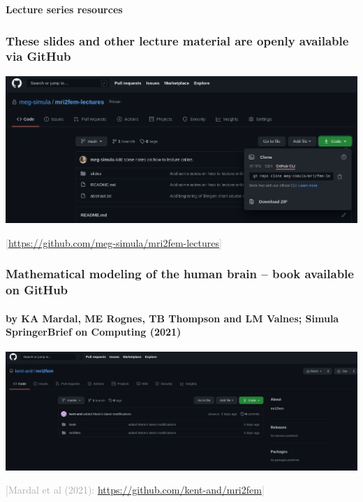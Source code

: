 \documentclass[mathserif, aspectratio=169]{beamer}
\newcommand{\refer}[1]{\begin{flushright}{\tiny \textcolor{darkgray}{[#1]}}\end{flushright}}
\newcommand{\mysection}[1]{\begin{frame} \begin{center} \vspace{3em} \textbf{#1} \end{center} \end{frame}}
\begin{document}
{
\begin{frame}
\end{frame}
}

\mysection{Lecture series resources}

\begin{frame}
  \frametitle{These slides and other lecture material are openly available via GitHub}
  \centering
  \includegraphics[width=\textwidth]{graphics/mri2fem-lectures-github.png} \\
  \refer{\href{https://github.com/meg-simula/mri2fem-lectures}{https://github.com/meg-simula/mri2fem-lectures}}
\end{frame}

\begin{frame}
  \frametitle{Mathematical modeling of the human brain -- book available on GitHub}
  \framesubtitle{by KA Mardal, ME Rognes, TB Thompson and LM Valnes; Simula SpringerBrief on Computing (2021)}
  \centering
  \includegraphics[width=\textwidth]{graphics/mri2fem-book-github.png} \\
  \refer{Mardal et al (2021): \href{https://github.com/kent-and/mri2fem}{https://github.com/kent-and/mri2fem}}
\end{frame}
\end{document}
